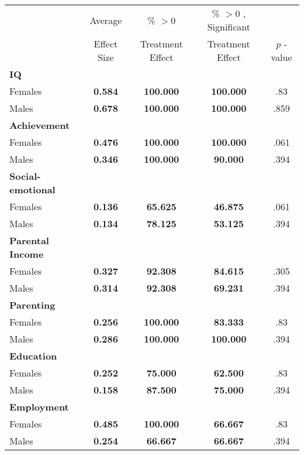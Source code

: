 \begin{tabular}{l c c c c}
\toprule
 & Average & \% $ >0 $ & \% $ >0 $ , Significant & \citet{Rosenbaum_2005_Distribution_JRSS} \\
 & Effect Size & Treatment Effect & Treatment Effect & $ p $ -value \\
\midrule
\textbf{IQ} & & & & \\
\quad Females &  \textbf{    0.584} & \textbf{  100.000} & \textbf{  100.000} & .83 \\
\quad Males &  \textbf{    0.678} & \textbf{  100.000} & \textbf{  100.000} & .859 \\
\midrule
\textbf{Achievement} & & & & \\
\quad Females &  \textbf{    0.476} & \textbf{  100.000} & \textbf{  100.000} & .061 \\
\quad Males &  \textbf{    0.346} & \textbf{  100.000} & \textbf{   90.000} & .394 \\
\midrule
\textbf{Social-emotional} & & & & \\
\quad Females &  \textbf{    0.136} & \textbf{   65.625} & \textbf{   46.875} & .061 \\
\quad Males &  \textbf{    0.134} & \textbf{   78.125} & \textbf{   53.125} & .394 \\
\midrule
\textbf{Parental Income} & & & & \\
\quad Females &  \textbf{    0.327} & \textbf{   92.308} & \textbf{   84.615} & .305 \\
\quad Males &  \textbf{    0.314} & \textbf{   92.308} & \textbf{   69.231} & .394 \\
\midrule
\textbf{Parenting} & & & & \\
\quad Females &  \textbf{    0.256} & \textbf{  100.000} & \textbf{   83.333} & .83 \\
\quad Males &  \textbf{    0.286} & \textbf{  100.000} & \textbf{  100.000} & .394 \\
\midrule
\textbf{Education} & & & & \\
\quad Females &  \textbf{    0.252} & \textbf{   75.000} & \textbf{   62.500} & .83 \\
\quad Males &  \textbf{    0.158} & \textbf{   87.500} & \textbf{   75.000} & .394 \\
\midrule
\textbf{Employment} & & & & \\
\quad Females &  \textbf{    0.485} & \textbf{  100.000} & \textbf{   66.667} & .83 \\
\quad Males &  \textbf{    0.254} & \textbf{   66.667} & \textbf{   66.667} & .394 \\

\end{tabular}
